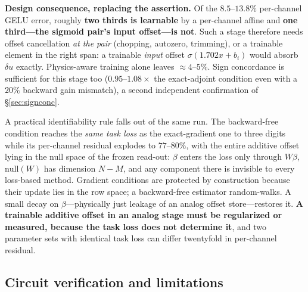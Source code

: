\documentclass[11pt]{article}
\begin{document}
\textbf{Design consequence, replacing the assertion.} Of the $8.5$--$13.8\%$ per-channel GELU error, roughly \textbf{two thirds is learnable} by a per-channel affine and \textbf{one third---the sigmoid pair's input offset---is not}. Such a stage therefore needs offset cancellation \textit{at the pair} (chopping, autozero, trimming), or a trainable element in the right span: a trainable \textit{input} offset $\sigma(1.702x + b_i)$ would absorb $\delta u$ exactly. Physics-aware training alone leaves ${\approx}4$--$5\%$. Sign concordance is sufficient for this stage too ($0.95$--$1.08\times$ the exact-adjoint condition even with a $20\%$ backward gain mismatch), a second independent confirmation of \S\ref{sec:signconc}.

A practical identifiability rule falls out of the same run. The backward-free condition reaches the \textit{same task loss} as the exact-gradient one to three digits while its per-channel residual explodes to $77$--$80\%$, with the entire additive offset lying in the null space of the frozen read-out: $\beta$ enters the loss only through $W\beta$, $\mathrm{null}(W)$ has dimension $N-M$, and any component there is invisible to every loss-based method. Gradient conditions are protected by construction because their update lies in the row space; a backward-free estimator random-walks. A small decay on $\beta$---physically just leakage of an analog offset store---restores it. \textbf{A trainable additive offset in an analog stage must be regularized or measured, because the task loss does not determine it}, and two parameter sets with identical task loss can differ twentyfold in per-channel residual.

\subsection{Circuit verification and limitations}
\end{document}
